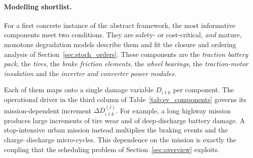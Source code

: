\documentclass[11pt,a4paper]{article}
\theoremstyle{plain}
\theoremstyle{definition}
\theoremstyle{remark}
\begin{document}
\paragraph{Modelling shortlist.}
For a first concrete instance of the abstract framework, the most informative components meet two conditions.
They are safety- or cost-critical, \emph{and} mature, monotone degradation models describe them and fit the closure and ordering analysis of Section~\ref{sec:stoch_orders}.
These components are the \emph{traction battery pack}, the \emph{tires}, the \emph{brake friction elements}, the \emph{wheel bearings}, the \emph{traction-motor insulation} and the \emph{inverter and converter power modules}.

Each of them maps onto a single damage variable $D_{i\ell k}$ per component.
The operational driver in the third column of Table~\ref{tab:ev_components} governs its mission-dependent increment $\Delta D^{(j)}_{i\ell k}$.
For example, a long highway mission produces large increments of tire wear and of deep-discharge battery damage.
A stop-intensive urban mission instead multiplies the braking events and the charge--discharge micro-cycles.
This dependence on the mission is exactly the coupling that the scheduling problem of Section~\ref{sec:overview} exploits.
\end{document}
